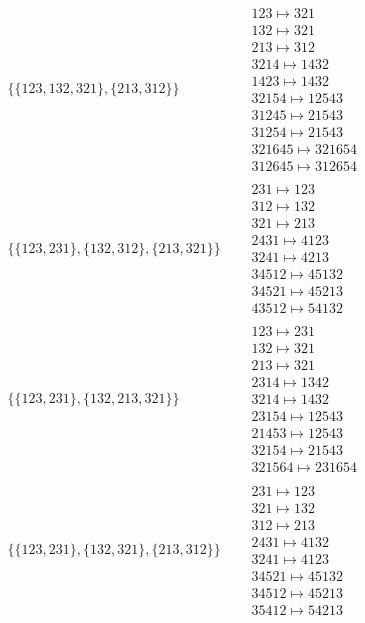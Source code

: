 \begin{tiny}
\begin{align}
\begin{matrix}
\end{matrix}
\\
\{\{123, 132, 321\}, \{213, 312\}\}
\quad
&
\begin{matrix}
123 \mapsto 321\\132 \mapsto 321\\213 \mapsto 312\\3214 \mapsto 1432\\1423 \mapsto 1432\\32154 \mapsto 12543\\31245 \mapsto 21543\\31254 \mapsto 21543\\321645 \mapsto 321654\\312645 \mapsto 312654
\end{matrix}
\\
\{\{123, 231\}, \{132, 312\}, \{213, 321\}\}
\quad
&
\begin{matrix}
231 \mapsto 123\\312 \mapsto 132\\321 \mapsto 213\\2431 \mapsto 4123\\3241 \mapsto 4213\\34512 \mapsto 45132\\34521 \mapsto 45213\\43512 \mapsto 54132
\end{matrix}
\\
\{\{123, 231\}, \{132, 213, 321\}\}
\quad
&
\begin{matrix}
123 \mapsto 231\\132 \mapsto 321\\213 \mapsto 321\\2314 \mapsto 1342\\3214 \mapsto 1432\\23154 \mapsto 12543\\21453 \mapsto 12543\\32154 \mapsto 21543\\321564 \mapsto 231654
\end{matrix}
\\
\{\{123, 231\}, \{132, 321\}, \{213, 312\}\}
\quad
&
\begin{matrix}
231 \mapsto 123\\321 \mapsto 132\\312 \mapsto 213\\2431 \mapsto 4132\\3241 \mapsto 4123\\34521 \mapsto 45132\\34512 \mapsto 45213\\35412 \mapsto 54213

\end{matrix}
\end{align}
\end{tiny}

